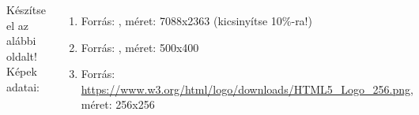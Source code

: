 \documentclass[usenames,dvipsnames,aspectratio=169]{beamer}
\newcommand{\hiv}[1]{{\color{hivatkozasszin}#1}}
\begin{document}
\begin{frame}
  \begin{columns}[c]
      Készítse el az alábbi oldalt! Képek adatai:
      \begin{enumerate}
        \item Forrás: , méret: 7088x2363 (kicsinyítse 10\%-ra!)
        \item Forrás: , méret: 500x400
        \item Forrás: \hiv{\href{https://www.w3.org/html/logo/downloads/HTML5\_Logo\_256.png}{https://www.w3.org/html/logo/downloads/HTML5\_Logo\_256.png}}, méret: 256x256
      \end{enumerate}
        \begin{center}
          \begin{exampleblock}{}
            \centering \includegraphics[scale=.14]{kep.png}
          \end{exampleblock}
        \end{center}
  \end{columns}  
\end{frame}
\end{document}
